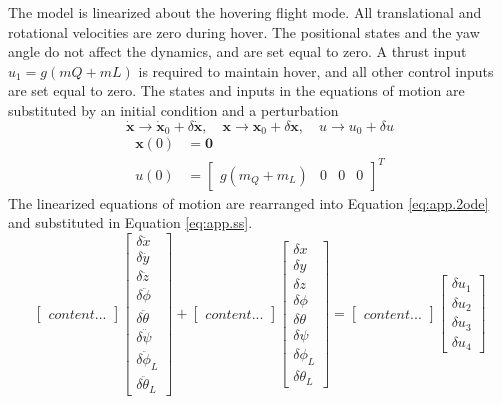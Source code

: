 The model is linearized about the hovering flight mode. All translational and rotational velocities are zero during hover. The positional states and the yaw angle do not affect the dynamics, and are set equal to zero. A thrust input $ u_1=g(mQ+mL) $ is required to maintain hover, and all other control inputs are set equal to zero. 
The states and inputs in the equations of motion are substituted by an initial condition and a perturbation
\begin{equation}\label{key}
\mathbf{\dot{x}}\rightarrow\mathbf{\dot{x}}_0+\delta\mathbf{\dot{x}}, \quad \mathbf{{x}}\rightarrow\mathbf{{x}}_0+\delta\mathbf{{x}}, \quad u\rightarrow u_0+\delta u
\end{equation}
\begin{equation}\label{key}
\begin{aligned}
\mathbf{x}(0) &= \mathbf{0}\\
u(0)&=\begin{bmatrix}
g(m_Q+m_L) &0 &0& 0
\end{bmatrix}^T
\end{aligned}
\end{equation}
The linearized equations of motion are rearranged into Equation \ref{eq:app.2ode} and substituted in Equation \ref{eq:app.ss}.
\begin{equation}\label{eq:app.2ode}
\begin{bmatrix}
content...
\end{bmatrix}
\begin{bmatrix}
		\delta \ddot{x} \\\delta\ddot{y}\\\delta\ddot{z}\\\delta\ddot{\phi}\\\delta\ddot{\theta}\\\delta\ddot{\psi}\\\delta\ddot{\phi}_L\\\delta\ddot{\theta}_L 
		\end{bmatrix}+
\begin{bmatrix}
content...
\end{bmatrix}
\begin{bmatrix}
		\delta {x} \\\delta{y}\\\delta{z}\\\delta{\phi}\\\delta{\theta}\\\delta{\psi}\\\delta{\phi}_L\\\delta{\theta}_L 
\end{bmatrix}
=
\begin{bmatrix}
content...
\end{bmatrix}
\begin{bmatrix}
\delta u_1\\\delta u_2\\\delta u_3\\\delta u_4
\end{bmatrix}
\end{equation}

